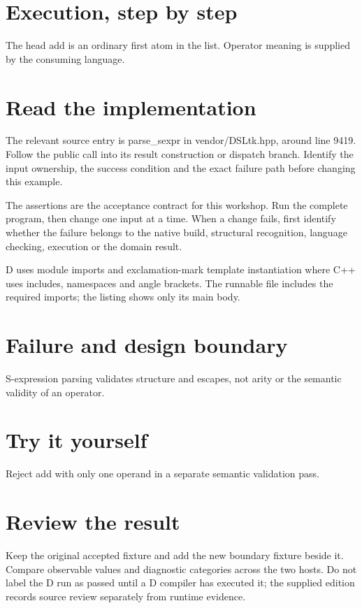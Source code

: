 
\section*{Execution, step by step}
The head add is an ordinary first atom in the list. Operator meaning is supplied by the consuming language.

\section*{Read the implementation}
The relevant source entry is parse\_sexpr in vendor/DSLtk.hpp, around line 9419. Follow the public call into its result construction or dispatch branch. Identify the input ownership, the success condition and the exact failure path before changing this example.

The assertions are the acceptance contract for this workshop. Run the complete program, then change one input at a time. When a change fails, first identify whether the failure belongs to the native build, structural recognition, language checking, execution or the domain result.

\clearpage
{}
D uses module imports and exclamation-mark template instantiation where C++ uses includes, namespaces and angle brackets. The runnable file includes the required imports; the listing shows only its main body.


\section*{Failure and design boundary}
S-expression parsing validates structure and escapes, not arity or the semantic validity of an operator.

\section*{Try it yourself}
Reject add with only one operand in a separate semantic validation pass.

\section*{Review the result}
Keep the original accepted fixture and add the new boundary fixture beside it. Compare observable values and diagnostic categories across the two hosts. Do not label the D run as passed until a D compiler has executed it; the supplied edition records source review separately from runtime evidence.

